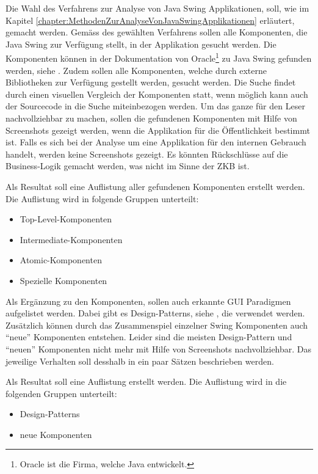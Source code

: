   Die Wahl des Verfahrens zur Analyse von Java Swing Applikationen, soll, wie im
  Kapitel \ref{chapter:MethodenZurAnalyseVonJavaSwingApplikationen} erläutert,
  gemacht werden. Gemäss des gewählten Verfahrens sollen alle Komponenten, die
  Java Swing zur Verfügung stellt, in der Applikation gesucht werden. Die
  Komponenten können in der Dokumentation von Oracle\footnote{Oracle ist die
  Firma, welche Java entwickelt.} zu Java Swing gefunden werden, siehe
  \cite{SwingComponentsByOracle}. Zudem sollen alle Komponenten, welche durch
  externe Bibliotheken zur Verfügung gestellt werden, gesucht werden. Die Suche
  findet durch einen visuellen Vergleich der Komponenten statt, wenn möglich
  kann auch der Sourcecode in die Suche miteinbezogen werden. Um das ganze für
  den Leser nachvollziehbar zu machen, sollen die gefundenen Komponenten mit
  Hilfe von Screenshots gezeigt werden, wenn die Applikation für die
  Öffentlichkeit bestimmt ist. Falls es sich bei der Analyse um eine
  Applikation für den internen Gebrauch handelt, werden keine Screenshots
  gezeigt. Es könnten Rückschlüsse auf die Business-Logik gemacht werden, was
  nicht im Sinne der \ac{ZKB} ist.
  
  Als Resultat soll eine Auflistung aller gefundenen Komponenten erstellt
  werden. Die Auflistung wird in folgende Gruppen unterteilt:
  
  \begin{itemize}
    \item Top-Level-Komponenten
    \item Intermediate-Komponenten
    \item Atomic-Komponenten
    \item Spezielle Komponenten
  \end{itemize}
  
  \noindent
  Als Ergänzung zu den Komponenten, sollen auch erkannte GUI Paradigmen
  aufgelistet werden. Dabei gibt es Design-Patterns, siehe
  \cite{DesignPattern}, die verwendet werden. Zusätzlich können durch das
  Zusammenspiel einzelner Swing Komponenten auch ``neue'' Komponenten entstehen.
  Leider sind die meisten Design-Pattern und ``neuen'' Komponenten nicht mehr
  mit Hilfe von Screenshots nachvollziehbar. Das jeweilige Verhalten soll
  desshalb in ein paar Sätzen beschrieben werden.
  
  Als Resultat soll eine Auflistung erstellt werden. Die Auflistung wird in die
  folgenden Gruppen unterteilt:
  
  \begin{itemize}
    \item Design-Patterns
    \item neue Komponenten
  \end{itemize}
  
